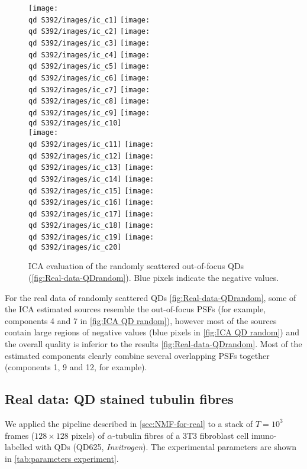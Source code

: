 \begin{figure}[htb]
	\newcommand{\wf}{.25}
	\newcommand{\barspace}{-.6cm}	
	\centering
	\texttt{[image: \\qd S392/images/ic\_c1]}
	\texttt{[image: \\qd S392/images/ic\_c2]}
	\texttt{[image: \\qd S392/images/ic\_c3]}
	\texttt{[image: \\qd S392/images/ic\_c4]}
	\texttt{[image: \\qd S392/images/ic\_c5]}
	\texttt{[image: \\qd S392/images/ic\_c6]}
	\texttt{[image: \\qd S392/images/ic\_c7]}
	\texttt{[image: \\qd S392/images/ic\_c8]}
	\texttt{[image: \\qd S392/images/ic\_c9]}
	\texttt{[image: \\qd S392/images/ic\_c10]}\\
	\texttt{[image: \\qd S392/images/ic\_c11]}
	\texttt{[image: \\qd S392/images/ic\_c12]}
	\texttt{[image: \\qd S392/images/ic\_c13]}
	\texttt{[image: \\qd S392/images/ic\_c14]}
	\texttt{[image: \\qd S392/images/ic\_c15]}
	\texttt{[image: \\qd S392/images/ic\_c16]}
	\texttt{[image: \\qd S392/images/ic\_c17]}
	\texttt{[image: \\qd S392/images/ic\_c18]}
	\texttt{[image: \\qd S392/images/ic\_c19]}
	\texttt{[image: \\qd S392/images/ic\_c20]}
	\caption{ICA evaluation of the randomly scattered out-of-focus QDs (\autoref{fig:Real-data-QDrandom}). Blue pixels indicate the negative values.}
	\label{fig:ICA QD random}
\end{figure}
%
For the real data of randomly scattered QDs \autoref{fig:Real-data-QDrandom}\aaa, some of the ICA estimated sources resemble the out-of-focus PSFs (for example, components 4 and 7 in \autoref{fig:ICA QD random}), however most of the sources contain large regions of negative values (blue pixels in \autoref{fig:ICA QD random}) and the overall quality is inferior to the \inmf{} results \autoref{fig:Real-data-QDrandom}\bbb. Most of the estimated components clearly combine several overlapping PSFs together (components 1, 9 and 12, for example). 
\afterpage{\clearpage}

\subsection{Real data: QD stained tubulin fibres\label{sub:results - tubulin}}
We applied the pipeline described in \autoref{sec:NMF-for-real} to a stack of $T=10^3$ frames ($128\times128$ pixels) of $\alpha$-tubulin fibres of a 3T3 fibroblast cell imuno-labelled with QDs (QD625, \emph{Invitrogen}). The experimental parameters are shown in \autoref{tab:parameters experiment}.

